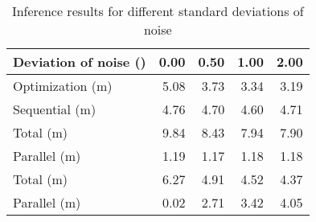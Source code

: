 \begin{table*}
  \centering
  \caption{Inference results for different standard deviations of noise}
  \ttfamily
  \begin{tabular}{lrrrr}
    \toprule
    \textnormal{Deviation of noise (\celsius{})} & 0.00 & 0.50 & 1.00 & 2.00 \\
    \midrule
    \textnormal{Optimization (m)}                & 5.08 & 3.73 & 3.34 & 3.19 \\
    \midrule
    \textnormal{Sequential (m)}                  & 4.76 & 4.70 & 4.60 & 4.71 \\
    \textnormal{Total (m)}                       & 9.84 & 8.43 & 7.94 & 7.90 \\
    \midrule
    \textnormal{Parallel (m)}                    & 1.19 & 1.17 & 1.18 & 1.18 \\
    \textnormal{Total (m)}                       & 6.27 & 4.91 & 4.52 & 4.37 \\
    \midrule
    \textnormal{Parallel (m)}                    & 0.02 & 2.71 & 3.42 & 4.05 \\
    \bottomrule
  \end{tabular}
\end{table*}

